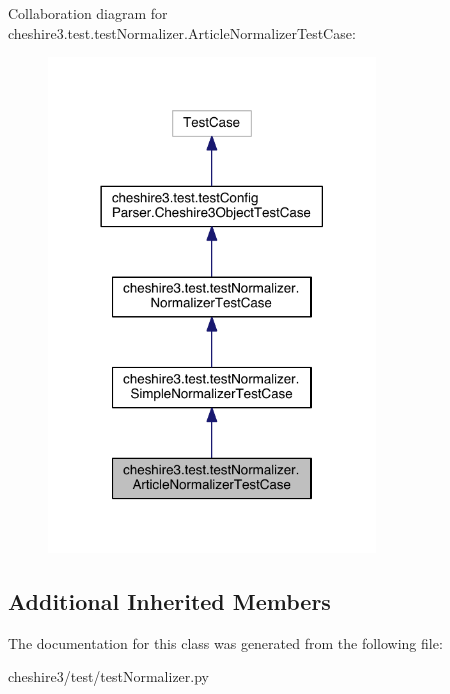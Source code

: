 Collaboration diagram for cheshire3.\-test.\-test\-Normalizer.\-Article\-Normalizer\-Test\-Case\-:
\nopagebreak
\begin{figure}[H]
\begin{center}
\leavevmode
\includegraphics[width=246pt]{classcheshire3_1_1test_1_1test_normalizer_1_1_article_normalizer_test_case__coll__graph}
\end{center}
\end{figure}
\subsection*{Additional Inherited Members}


The documentation for this class was generated from the following file\-:\begin{DoxyCompactItemize}
\item 
cheshire3/test/test\-Normalizer.\-py\end{DoxyCompactItemize}
